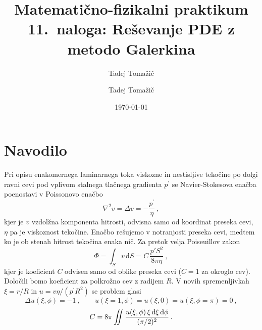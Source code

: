 \documentclass[slovene,11pt,a4paper]{article}
\title{
\sc\large Matematično-fizikalni praktikum \thisyear\\
\bigskip
\bf\Large 11.~naloga: Reševanje PDE z metodo Galerkina
}
\author{Tadej Tomažič}
\date{}
\newcommand{\dd}{\,\mathrm{d}}
\renewcommand{\iint}{\mathop{\int\mkern-13mu\int}}
\begin{document}
\author{Tadej Tomažič}
\date{\today}

\maketitle

\newpage
{}
\tableofcontents
\listoffigures
\newpage
\vspace{-1cm}
\section{Navodilo}



Pri opisu enakomernega laminarnega toka viskozne in nestisljive
tekočine po dolgi ravni cevi pod vplivom stalnega tlačnega
gradienta $p^{\prime}$ se Navier-Stokesova enačba poenostavi
v Poissonovo enačbo
\begin{equation*}
  \nabla^2 v = \Delta v = - \frac{p^\prime}{\eta}\>,
\end{equation*}
kjer je $v$ vzdolžna komponenta hitrosti, odvisna samo  od
koordinat preseka cevi, $\eta$ pa je viskoznost tekočine.
Enačbo rešujemo v notranjosti preseka cevi, medtem ko
je ob stenah hitrost tekočina enaka nič.  Za pretok velja
Poiseuillov zakon
\begin{equation*}
  \Phi = \int_S v\dd S = C\,\frac{p' S^2}{ 8\pi\eta} \>,
\end{equation*}
kjer je koeficient $C$ odvisen samo od oblike preseka cevi
($C=1$ za okroglo cev).  Določili bomo koeficient za
polkrožno cev z radijem $R$. V novih spremenljivkah $\xi=r/R$
in $u=v \eta/(p^\prime R^2)$ se problem glasi
\begin{equation*}
\Delta u(\xi,\phi) = -1 \>,\qquad
u(\xi=1,\phi)=u(\xi,0)=u(\xi,\phi=\pi)=0 \>,
\end{equation*}
\begin{equation*}
  C = 8\pi \iint \frac{u(\xi,\phi)\,\xi\dd \xi \dd\phi}{ (\pi/2)^2} \>.
\end{equation*}
\end{document}
